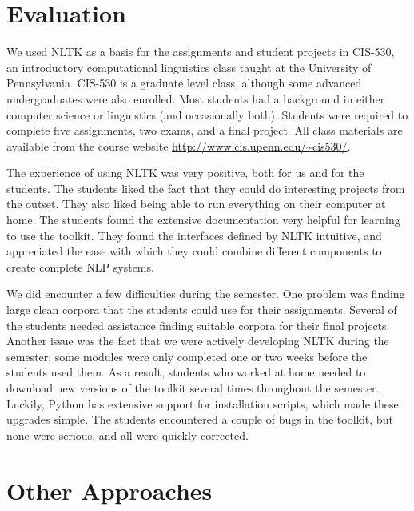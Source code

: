 \documentclass[11pt]{article}
\begin{document}
\section{Evaluation}
\label{sec:evaluation}

We used NLTK as a basis for the assignments and student projects in
CIS-530, an introductory computational linguistics class taught at the
University of Pennsylvania.  CIS-530 is a graduate level class,
although some advanced undergraduates were also enrolled.  Most
students had a background in either computer science or linguistics
(and occasionally both).  Students were required to complete five assignments,
two exams, and a final project.  All class materials are available
from the course website \mbox{\url{http://www.cis.upenn.edu/~cis530/}}.

The experience of using NLTK was very positive, both for us and for
the students.  The students liked the fact that they could do
interesting projects from the outset.  They also liked being able to
run everything on their computer at home.  The students found the
extensive documentation very helpful for learning to use the toolkit.
They found the interfaces defined by NLTK intuitive, and appreciated
the ease with which they could combine different components to create
complete NLP systems.

We did encounter a few difficulties during the semester.  One problem
was finding large clean corpora that the students could use for their
assignments.  Several of the students needed assistance finding
suitable corpora for their final projects.  Another issue was the fact
that we were actively developing NLTK during the semester; some
modules were only completed one or two weeks before the students used
them.  As a result, students who worked at home needed to download new
versions of the toolkit several times throughout the semester.
Luckily, Python has extensive support for installation scripts, which
made these upgrades simple.  The students encountered a couple
of bugs in the toolkit, but none were serious, and all were quickly
corrected.

\section{Other Approaches}
\label{sec:approaches}
\end{document}

